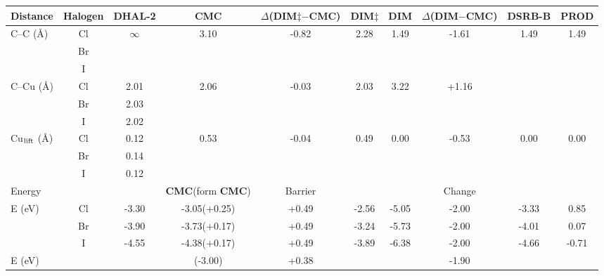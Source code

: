 \documentclass[%
 reprint,
 amsmath,amssymb,
 aps,
prb,
floatfix,
]{revtex4-2}
\begin{document}

\begin{table}
\centering
\begin{tabular}{ lccccccccc  }
 \hline
 \hline
 Distance & Halogen & \textbf{DHAL-2} & \textbf{CMC} & $\Delta$(\textbf{DIM$\ddagger$}$-$\textbf{CMC}) & \textbf{DIM$\ddagger$} & \textbf{DIM} & $\Delta$(\textbf{DIM}$-$\textbf{CMC}) & \textbf{DSRB-B} & \textbf{PROD}\\ 
 \hline 
 \multirow{3}{*}{C--C (\si{\angstrom})} & Cl & \multirow{3}{*}{$\infty$} & \multirow{3}{*}{3.10} & \multirow{3}{*}{-0.82} & \multirow{3}{*}{2.28} & \multirow{3}{*}{1.49} & \multirow{3}{*}{-1.61} & \multirow{3}{*}{1.49} &\multirow{3}{*}{1.49}\\ 
 & Br & &  &  &  & & & &\\ 
 & I & &  &  &  & & & &\\ 
 \hline
 \multirow{3}{*}{C--Cu (\si{\angstrom}) } & Cl & 2.01 & \multirow{3}{*}{2.06} & \multirow{3}{*}{-0.03} & \multirow{3}{*}{2.03} & \multirow{3}{*}{3.22} & \multirow{3}{*}{+1.16} & \multirow{3}{*}{} &\multirow{3}{*}{}\\ 
 & Br & 2.03 &  &  &  & & & &\\ 
 & I &2.02 &  &  &  & & & &\\ 
 \hline
 \multirow{3}{*}{Cu$_{\rm lift}$ (\si{\angstrom}) } & Cl & 0.12 & \multirow{3}{*}{0.53} & \multirow{3}{*}{-0.04} & \multirow{3}{*}{0.49} & \multirow{3}{*}{0.00} & \multirow{3}{*}{-0.53} & \multirow{3}{*}{0.00} &\multirow{3}{*}{0.00}\\ 
 & Br & 0.14 &  &  &  & & & &\\ 
 & I &0.12 &  &  &  & & & &\\ 
 \hline
 \hline
 Energy & & & \textbf{CMC}(form \textbf{CMC}) & Barrier & & & Change & &\\
 \hline
 \multirow{3}{*}{E (\si{\electronvolt}) } & Cl & -3.30 & -3.05(+0.25) &+0.49 &-2.56 & -5.05 & -2.00& -3.33&0.85\\ 
 & Br &-3.90 & -3.73(+0.17) &+0.49 & -3.24& -5.73 & -2.00& -4.01&0.07\\ 
 & I  & -4.55 & -4.38(+0.17) & +0.49& -3.89& -6.38 & -2.00& -4.66&-0.71\\ 
 \hline
 E (\si{\electronvolt})~\cite{pccp2010} & & & (-3.00) & +0.38 & & & -1.90 & & \\

\end{tabular}
\end{table}
\end{document}
